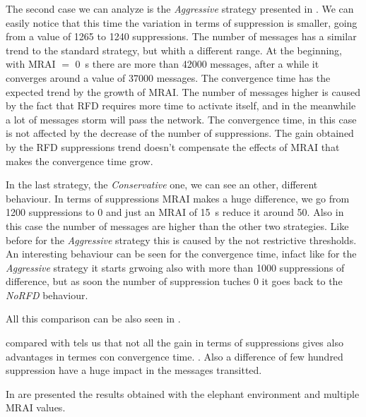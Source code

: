 The second case we can analyze is the \textit{Aggressive} strategy presented
in .
We can easily notice that this time the variation in terms of suppression is smaller,
going from a value of \num{1265} to \num{1240} suppressions.
The number of messages has a similar trend to the standard strategy, but whith
a different range.
At the beginning, with \ac{MRAI} $=$ \SI{0}{\second} there are more than \num{42000}
messages, after a while it converges around a value of \num{37000} messages.
The convergence time has the expected trend by the growth of \ac{MRAI}.
The number of messages higher is caused by the fact that \ac{RFD} requires more time
to activate itself, and in the meanwhile a lot of messages storm will pass the
network.
The convergence time, in this case is not affected by the decrease of the number
of suppressions.
The gain obtained by the \ac{RFD} suppressions trend doesn't compensate the 
effects of \ac{MRAI} that makes the convergence time grow.

In the last strategy, the \textit{Conservative} one, we can see an other, different
behaviour.
In terms of suppressions \ac{MRAI} makes a huge difference, we go from \num{1200}
suppressions to \num{0} and just an \ac{MRAI} of \SI{15}{\second} reduce it around
\num{50}.
Also in this case the number of messages are higher than the other two strategies.
Like before for the \textit{Aggressive} strategy this is caused by the not
restrictive thresholds.
An interesting behaviour can be seen for the convergence time, infact like for
the \textit{Aggressive} strategy it starts grwoing also with more than \num{1000}
suppressions of difference, but as soon the number of suppression tuches \num{0}
it goes back to the \textit{NoRFD} behaviour.

All this comparison can be also seen in .

 compared with 
tels us that not all the gain in terms of suppressions gives also advantages in 
termes con convergence time.
.
Also a difference of few hundred suppression have a huge impact in the messages
transitted.

In  are presented the results obtained
with the elephant environment and multiple \ac{MRAI} values.

